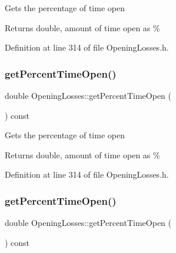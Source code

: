 Gets the percentage of time open

\begin{DoxyReturn}{Returns}
double, amount of time open as \% 
\end{DoxyReturn}


Definition at line 314 of file Opening\+Losses.\+h.

\mbox{\label{class_opening_losses_aeefc3790a569008ff2e804033a9efea3}} 
\subsubsection{\texorpdfstring{get\+Percent\+Time\+Open()}{getPercentTimeOpen()}\hspace{0.1cm}{\footnotesize\ttfamily [2/3]}}
{\footnotesize\ttfamily double Opening\+Losses\+::get\+Percent\+Time\+Open (\begin{DoxyParamCaption}{ }\end{DoxyParamCaption}) const\hspace{0.3cm}{\ttfamily [inline]}}

Gets the percentage of time open

\begin{DoxyReturn}{Returns}
double, amount of time open as \% 
\end{DoxyReturn}


Definition at line 314 of file Opening\+Losses.\+h.

\mbox{\label{class_opening_losses_aeefc3790a569008ff2e804033a9efea3}} 
\subsubsection{\texorpdfstring{get\+Percent\+Time\+Open()}{getPercentTimeOpen()}\hspace{0.1cm}{\footnotesize\ttfamily [3/3]}}
{\footnotesize\ttfamily double Opening\+Losses\+::get\+Percent\+Time\+Open (\begin{DoxyParamCaption}{ }\end{DoxyParamCaption}) const\hspace{0.3cm}{\ttfamily [inline]}}

